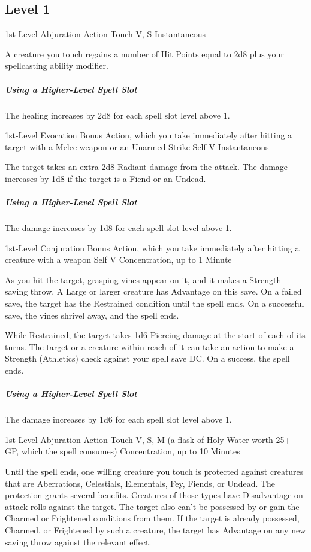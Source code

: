 \documentclass[letterpaper,openany,oneside,twocolumn]{book}
\begin{document}
\subsection*{Level 1}
	{1st-Level Abjuration}
	{Action}
	{Touch}
	{V, S}
	{Instantaneous}

A creature you touch regains a number of Hit Points equal to 2d8 plus your spellcasting ability modifier.

\subparagraph*{Using a Higher-Level Spell Slot} The healing increases by 2d8 for each spell slot level above 1.

	{1st-Level Evocation}
	{Bonus Action, which you take immediately after hitting a target with a Melee weapon or an Unarmed Strike}
	{Self}
	{V}
	{Instantaneous}

The target takes an extra 2d8 Radiant damage from the attack. The damage increases by 1d8 if the target is a Fiend or an Undead.

\subparagraph*{Using a Higher-Level Spell Slot} The damage increases by 1d8 for each spell slot level above 1.

	{1st-Level Conjuration}
	{Bonus Action, which you take immediately after hitting a creature with a weapon}
	{Self}
	{V}
	{Concentration, up to 1 Minute}

As you hit the target, grasping vines appear on it, and it makes a Strength saving throw. A Large or larger creature has Advantage on this save. On a failed save, the target has the Restrained condition until the spell ends. On a successful save, the vines shrivel away, and the spell ends.

While Restrained, the target takes 1d6 Piercing damage at the start of each of its turns. The target or a creature within reach of it can take an action to make a Strength (Athletics) check against your spell save DC. On a success, the spell ends.

\subparagraph*{Using a Higher-Level Spell Slot} The damage increases by 1d6 for each spell slot level above 1.

	{1st-Level Abjuration}
	{Action}
	{Touch}
	{V, S, M (a flask of Holy Water worth 25+ GP, which the spell consumes)}
	{Concentration, up to 10 Minutes}

Until the spell ends, one willing creature you touch is protected against creatures that are Aberrations, Celestials, Elementals, Fey, Fiends, or Undead. The protection grants several benefits. Creatures of those types have Disadvantage on attack rolls against the target. The target also can't be possessed by or gain the Charmed or Frightened conditions from them. If the target is already possessed, Charmed, or Frightened by such a creature, the target has Advantage on any new saving throw against the relevant effect.
\end{document}
